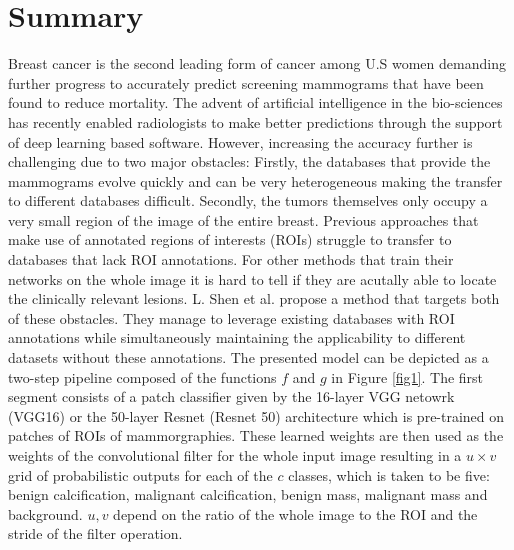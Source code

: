 \section{Summary}
Breast cancer is the second leading form of cancer among U.S women demanding further progress to accurately predict screening mammograms that have been found to reduce mortality. The advent of artificial intelligence in the bio-sciences has recently enabled radiologists to make better predictions through the support of deep learning based software. However, increasing the accuracy further is challenging due to two major obstacles: Firstly, the databases that provide the mammograms evolve quickly and can be very heterogeneous making the transfer to different databases difficult. Secondly, the tumors themselves only occupy a very small region of the image of the entire breast. Previous approaches that make use of annotated regions of interests (ROIs) struggle to transfer to databases that lack ROI annotations. For other methods that train their networks on the whole image it is hard to tell if they are acutally able to locate the clinically relevant lesions.
L. Shen et al. propose a method that targets both of these obstacles. They manage to leverage existing databases with ROI annotations while simultaneously maintaining the applicability to different datasets without these annotations. 
\newline
\newline
The presented model can be depicted as a two-step pipeline composed of the functions $f$ and $g$ in Figure \ref{fig1}.  The first segment consists of a patch classifier given by the 16-layer VGG netowrk (VGG16) or the 50-layer Resnet (Resnet 50) architecture which is pre-trained on patches of ROIs of mammorgraphies. These learned weights are then used as the weights of the convolutional filter for the whole input image resulting in a $u\times v$ grid of  probabilistic outputs for each of the $c$ classes, which is taken to be five:  benign calcification, malignant calcification, benign mass, malignant mass and background. $u,v$ depend on the ratio of the whole image to the ROI and the stride of the filter operation. 

